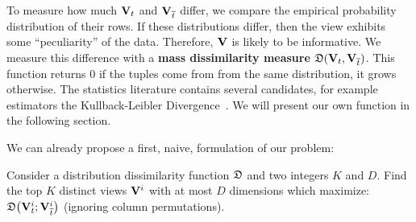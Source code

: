 To measure how much $\mathbf{V}_t$ and ${\mathbf{V}}_{\overline{t}}$ differ, we compare
the empirical probability distribution of their rows. If these distributions
differ, then the view exhibits some ``peculiarity'' of the data.  Therefore,
$\mathbf{V}$ is likely to be informative. We measure this difference with a
\textbf{mass dissimilarity measure} $\mathfrak{D}(\mathbf{V}_t, \mathbf{V}_{\overline{t}})$.  This
function returns 0 if the tuples come from from the same distribution, it grows
otherwise. The statistics literature contains several candidates, for example
estimators the Kullback-Leibler Divergence~\cite{wasserman2013all}. We will
present our own function in the following section.

We can already propose a first, naive, formulation of our problem:
\begin{problem}
    Consider a distribution dissimilarity function $\mathfrak{D}$ and two integers
    $K$ and $D$. Find the top $K$ distinct views $\mathbf{V}^i$ with at most $D$
    dimensions which maximize: $ \mathfrak{D}\big( \mathbf{V}^i_t ;
    \mathbf{V}^i_{\overline{t}} \big)$ (ignoring column permutations).
\end{problem}

